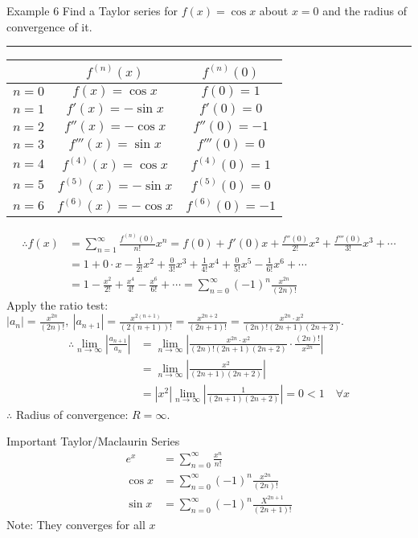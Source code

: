 \documentclass[12pt,a4paper]{article}
\begin{document}
\begin{eg}{Example 6}
	Find a Taylor series for $f(x)=\cos{x}$ about $x=0$ and the radius of convergence of it. \\
	\noindent\rule[0.25\baselineskip]{\textwidth}{1pt}
	\begin{center}
		\begin{tabular}{c|c|c}
			&$f^{(n)}(x)$ & $f^{(n)}(0)$\\
			\hline
			$n=0$&$f(x)=\cos{x}$&$f(0)=1$\\
			$n=1$&$f'(x)=-\sin{x}$&$f'(0)=0$\\
			$n=2$&$f''(x)=-\cos{x}$&$f''(0)=-1$\\
			$n=3$&$f'''(x)=\sin{x}$&$f'''(0)=0$\\
			$n=4$&$f^{(4)}(x)=\cos{x}$&$f^{(4)}(0)=1$\\
			$n=5$&$f^{(5)}(x)=-\sin{x}$&$f^{(5)}(0)=0$\\
			$n=6$&$f^{(6)}(x)=-\cos{x}$&$f^{(6)}(0)=-1$
		\end{tabular}
	\end{center}
	$$\begin{aligned}
		\therefore f(x)&=\sum^\infty_{n=1}\frac{f^{(n)}(0)}{n!}x^n=f(0)+f'(0)x+\frac{f''(0)}{2!}x^2+\frac{f'''(0)}{3!}x^3+\cdots\\
		&=1+0\cdot x-\frac{1}{2!}x^2+\frac{0}{3!}x^3+\frac{1}{4!}x^4+\frac{0}{5!}x^5-\frac{1}{6!}x^6+\cdots\\
		&=1-\frac{x^2}{2!}+\frac{x^4}{4!}-\frac{x^6}{6!}+\cdots=\sum^\infty_{n=0}(-1)^n\frac{x^{2n}}{(2n)!}
	\end{aligned}$$
	Apply the ratio test: $\displaystyle |a_n|=\frac{x^{2n}}{(2n)!},\ |a_{n+1}|=\frac{x^{2(n+1)}}{(2(n+1))!}=\frac{x^{2n+2}}{(2n+1)!}=\frac{x^{2n}\cdot x^2}{(2n)!(2n+1)(2n+2)}$.
	$$\begin{aligned}
		\therefore\lim_{n\to\infty}\left|\frac{a_{n+1}}{a_n}\right|&=\lim_{n\to\infty}\left|\frac{x^{2n}\cdot x^2}{(2n)!(2n+1)(2n+2)}\cdot\frac{(2n)!}{x^{2n}}\right|\\
		&=\lim_{n\to\infty}\left|\frac{x^2}{(2n+1)(2n+2)}\right|\\
		&=|x^2|\lim_{n\to\infty}\left|\frac{1}{(2n+1)(2n+2)}\right|=0<1 \quad\forall x
	\end{aligned}$$
	$\therefore$ Radius of convergence: $R=\infty$.
\end{eg}
\begin{rmk}{Important Taylor/Maclaurin Series}
	$$\begin{aligned}
		e^{x}&=\sum^\infty_{n=0}\frac{x^n}{n!}\\
		\cos{x}&=\sum^\infty_{n=0}(-1)^n\frac{x^{2n}}{(2n)!}\\
		\sin{x}&=\sum^\infty_{n=0}(-1)^n\frac{X^{2n+1}}{(2n+1)!}
	\end{aligned}$$
	Note: They converges for all $x$
\end{rmk}
\end{document}
